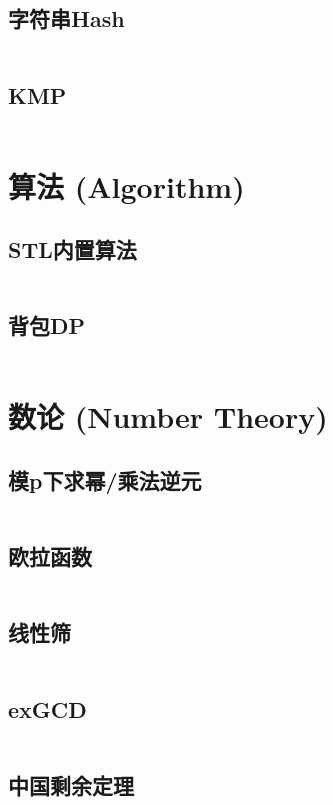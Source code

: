 \documentclass[openany,a4paper]{book}
\begin{document}
\section{字符串Hash}
\inputminted{cpp}{String/hash.h}

\section{KMP}
\inputminted{cpp}{String/kmp.h}

\chapter{算法 (Algorithm)}

\section{STL内置算法}
\inputminted{cpp}{Algorithm/STL.h}

\section{背包DP}
\inputminted{cpp}{Algorithm/dp.h}

\chapter{数论 (Number Theory)}

\section{模p下求幂/乘法逆元}
\inputminted{cpp}{NumberTheory/modPow.h}

\section{欧拉函数}
\inputminted{cpp}{NumberTheory/EulerFunction.h}

\section{线性筛}
\inputminted{cpp}{NumberTheory/linearSieve.h}

\section{exGCD}
\inputminted{cpp}{NumberTheory/exgcd.h}

\section{中国剩余定理}
\inputminted{cpp}{NumberTheory/CRT.h}
\end{document}

